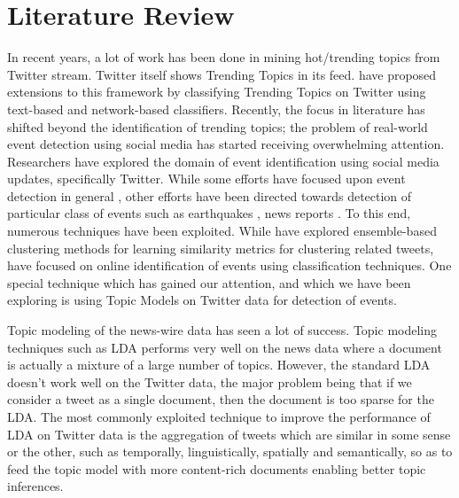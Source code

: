 \chapter{Literature Review}
In recent years, a lot of work has been done in mining hot/trending topics from Twitter stream. Twitter itself shows Trending Topics in its feed. \cite{lee2011twitter} have proposed extensions to this framework by classifying Trending Topics on Twitter using text-based and network-based classifiers. Recently, the focus in literature has shifted beyond the identification of trending topics; the problem of real-world event detection using social media has started receiving overwhelming attention. Researchers have explored the domain of event identification using social media updates, specifically Twitter. While some efforts have focused upon event detection in general \cite{becker2010learning}, other efforts have been directed towards detection of particular class of events such as earthquakes \cite{sakaki2010earthquake}, news reports \cite{sankaranarayanan2009twitterstand}. To this end, numerous techniques have been exploited. While \cite{becker2010learning} have explored ensemble-based clustering methods for learning similarity metrics for clustering related tweets, \cite{becker2011beyond} have focused on online identification of events using classification techniques. One special technique which has gained our attention, and which we have been exploring is using Topic Models on Twitter data for detection of events.

Topic modeling of the news-wire data has seen a lot of success. Topic modeling techniques such as LDA performs very well on the news data where a document is actually a mixture of a large number of topics. However, the standard LDA doesn't work well on the Twitter data, the major problem being that if we consider a tweet as a single document, then the document is too sparse for the LDA. The most commonly exploited technique to improve the performance of LDA on Twitter data is the aggregation of tweets which are similar in some sense or the other, such as temporally, linguistically, spatially and semantically, so as to feed the topic model with more content-rich documents enabling better topic inferences.

